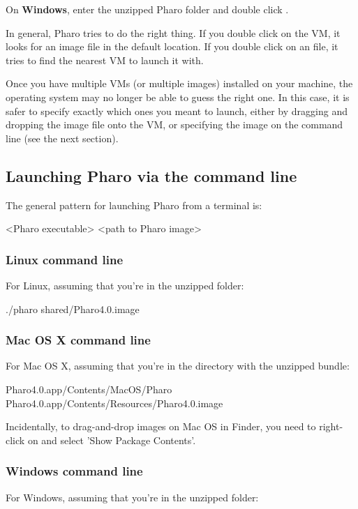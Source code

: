 \documentclass[a4paper,10pt,twoside]{book}
\begin{document}
On \textbf{Windows}, enter the unzipped Pharo folder and double click .

In general, Pharo tries to do the right thing. If you double click on the VM,
it looks for an image file in the default location. If you double click on an
 file, it tries to find the nearest VM to launch it with.

Once you have multiple VMs (or multiple images) installed on your
machine, the operating system may no longer be able to guess the right one. In this
case, it is safer to specify exactly which ones you meant to launch, either
by dragging and dropping the image file onto the VM, or specifying the image on
the command line (see the next section).
\subsection{Launching Pharo via the command line}\label{Launching Pharo via the command line}
The general pattern for launching Pharo from a terminal is:


\begin{code}{}
<Pharo executable> <path to Pharo image>
\end{code}

\subsubsection{Linux command line}\label{Linux command line}
For Linux, assuming that you're in the unzipped  folder:


\begin{code}{}
./pharo shared/Pharo4.0.image
\end{code}

\subsubsection{Mac OS X command line}\label{Mac OS X command line}
For Mac OS X, assuming that you're in the directory with the unzipped
 bundle:


\begin{code}{}
Pharo4.0.app/Contents/MacOS/Pharo Pharo4.0.app/Contents/Resources/Pharo4.0.image
\end{code}


Incidentally, to drag-and-drop images on Mac OS in Finder, you need to
right-click on  and select 'Show Package Contents'.
\subsubsection{Windows command line}\label{Windows command line}
For Windows, assuming that you're in the unzipped  folder:
\end{document}
